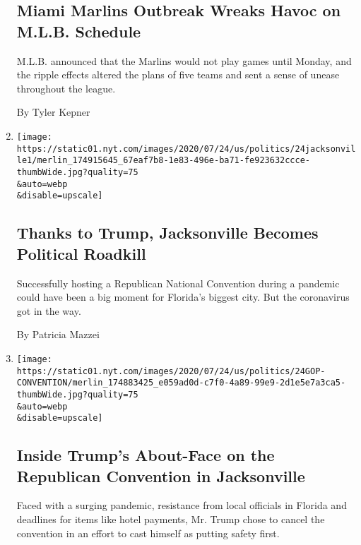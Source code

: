 \begin{enumerate}
  \hypertarget{miami-marlins-outbreak-wreaks-havoc-on-mlb-schedule}{%
  \subsection{Miami Marlins Outbreak Wreaks Havoc on M.L.B.
  Schedule}\label{miami-marlins-outbreak-wreaks-havoc-on-mlb-schedule}}

  M.L.B. announced that the Marlins would not play games until Monday,
  and the ripple effects altered the plans of five teams and sent a
  sense of unease throughout the league.

  By Tyler Kepner
\item
  \href{/2020/07/25/us/politics/trump-rnc-jacksonville.html}{}

  \texttt{[image: https://static01.nyt.com/images/2020/07/24/us/politics/24jacksonville1/merlin\_174915645\_67eaf7b8-1e83-496e-ba71-fe923632ccce-thumbWide.jpg?quality=75\\\&auto=webp\\\&disable=upscale]}

  \hypertarget{thanks-to-trump-jacksonville-becomes-political-roadkill}{%
  \subsection{Thanks to Trump, Jacksonville Becomes Political
  Roadkill}\label{thanks-to-trump-jacksonville-becomes-political-roadkill}}

  Successfully hosting a Republican National Convention during a
  pandemic could have been a big moment for Florida's biggest city. But
  the coronavirus got in the way.

  By Patricia Mazzei
\item
  \href{/2020/07/24/us/politics/trump-republican-convention-canceled-jacksonville.html}{}

  \texttt{[image: https://static01.nyt.com/images/2020/07/24/us/politics/24GOP-CONVENTION/merlin\_174883425\_e059ad0d-c7f0-4a89-99e9-2d1e5e7a3ca5-thumbWide.jpg?quality=75\\\&auto=webp\\\&disable=upscale]}

  \hypertarget{inside-trumps-about-face-on-the-republican-convention-in-jacksonville}{%
  \subsection{Inside Trump's About-Face on the Republican Convention in
  Jacksonville}\label{inside-trumps-about-face-on-the-republican-convention-in-jacksonville}}

  Faced with a surging pandemic, resistance from local officials in
  Florida and deadlines for items like hotel payments, Mr. Trump chose
  to cancel the convention in an effort to cast himself as putting
  safety first.


\end{enumerate}

